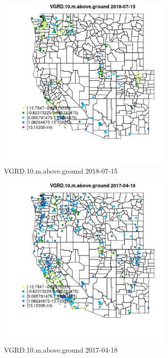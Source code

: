 \begin{figure} 
\centering  
\includegraphics[width=0.77\textwidth]{Code_Outputs/Report_ML_input_PM25_Step4_part_e_de_duplicated_aves_compiled_2019-05-20wNAs_MapObsVGRD10maboveground2018-07-15.jpg} 
\caption{\label{fig:Report_ML_input_PM25_Step4_part_e_de_duplicated_aves_compiled_2019-05-20wNAsMapObsVGRD10maboveground2018-07-15}VGRD.10.m.above.ground 2018-07-15} 
\end{figure} 
 

\begin{figure} 
\centering  
\includegraphics[width=0.77\textwidth]{Code_Outputs/Report_ML_input_PM25_Step4_part_e_de_duplicated_aves_compiled_2019-05-20wNAs_MapObsVGRD10maboveground2017-04-18.jpg} 
\caption{\label{fig:Report_ML_input_PM25_Step4_part_e_de_duplicated_aves_compiled_2019-05-20wNAsMapObsVGRD10maboveground2017-04-18}VGRD.10.m.above.ground 2017-04-18} 
\end{figure} 
 


